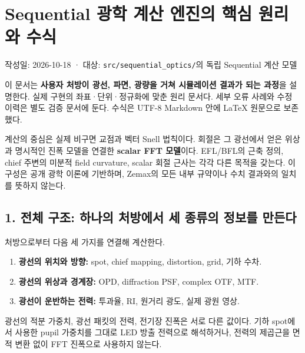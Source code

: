 \documentclass[
  a4paper,
]{article}
\author{}
\date{}
\providecommand{\tightlist}{%
  \setlength{\itemsep}{0pt}\setlength{\parskip}{0pt}}
\begin{document}
\hypertarget{sequential-uxad11uxd559-uxacc4uxc0b0-uxc5d4uxc9c4uxc758-uxd575uxc2ec-uxc6d0uxb9acuxc640-uxc218uxc2dd}{%
\section{Sequential 광학 계산 엔진의 핵심 원리와
수식}\label{sequential-uxad11uxd559-uxacc4uxc0b0-uxc5d4uxc9c4uxc758-uxd575uxc2ec-uxc6d0uxb9acuxc640-uxc218uxc2dd}}

작성일: 2026-10-18 · 대상: \texttt{src/sequential\_optics/}의 독립
Sequential 계산 모델

이 문서는 \textbf{사용자 처방이 광선, 파면, 광량을 거쳐 시뮬레이션
결과가 되는 과정}을 설명한다. 실제 구현의 좌표·단위·정규화에 맞춘 원리
문서다. 세부 오류 사례와 수정 이력은 별도 검증 문서에 둔다. 수식은 UTF-8
Markdown 안에 LaTeX 원문으로 보존했다.

계산의 중심은 실제 비구면 교점과 벡터 Snell 법칙이다. 회절은 그 광선에서
얻은 위상과 명시적인 진폭 모델을 연결한 \textbf{scalar FFT 모델}이다.
EFL/BFL의 근축 정의, chief 주변의 미분적 field curvature, scalar 회절
근사는 각각 다른 목적을 갖는다. 이 구성은 공개 광학 이론에 기반하며,
Zemax의 모든 내부 규약이나 수치 결과와의 일치를 뜻하지 않는다.

\hypertarget{uxc804uxccb4-uxad6cuxc870-uxd558uxb098uxc758-uxcc98uxbc29uxc5d0uxc11c-uxc138-uxc885uxb958uxc758-uxc815uxbcf4uxb97c-uxb9ccuxb4e0uxb2e4}{%
\subsection{1. 전체 구조: 하나의 처방에서 세 종류의 정보를
만든다}\label{uxc804uxccb4-uxad6cuxc870-uxd558uxb098uxc758-uxcc98uxbc29uxc5d0uxc11c-uxc138-uxc885uxb958uxc758-uxc815uxbcf4uxb97c-uxb9ccuxb4e0uxb2e4}}

처방으로부터 다음 세 가지를 연결해 계산한다.

\begin{enumerate}
\def\labelenumi{\arabic{enumi}.}
\tightlist
\item
  \textbf{광선의 위치와 방향:} spot, chief mapping, distortion, grid,
  기하 수차.
\item
  \textbf{광선의 위상과 경계장:} OPD, diffraction PSF, complex OTF, MTF.
\item
  \textbf{광선이 운반하는 전력:} 투과율, RI, 원거리 광도, 실제 광원
  영상.
\end{enumerate}

광선의 적분 가중치, 광선 패킷의 전력, 전기장 진폭은 서로 다른 값이다.
기하 spot에서 사용한 pupil 가중치를 그대로 LED 방출 전력으로 해석하거나,
전력의 제곱근을 면적 변환 없이 FFT 진폭으로 사용하지 않는다.
\end{document}
